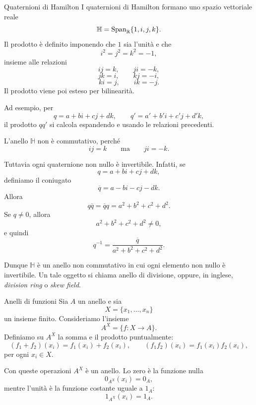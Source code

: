 \documentclass[a4paper]{article}
\begin{document}
\begin{radioactive}
\begin{snippetexample}{Quaternioni di Hamilton}
    I quaternioni di Hamilton formano uno spazio vettoriale reale
    \[
        \mathbb{H}
        =
        \operatorname{Span}_{\mathbb{R}}\{1,i,j,k\}.
    \]
    Il prodotto è definito imponendo che \(1\) sia l'unità e che
    \[
        i^2=j^2=k^2=-1,
    \]
    insieme alle relazioni
    \[
        ij=k,
        \qquad
        ji=-k,
    \]
    \[
        jk=i,
        \qquad
        kj=-i,
    \]
    \[
        ki=j,
        \qquad
        ik=-j.
    \]
    Il prodotto viene poi esteso per bilinearità.

    Ad esempio, per
    \[
        q=a+bi+cj+dk,
        \qquad
        q'=a'+b'i+c'j+d'k,
    \]
    il prodotto \(qq'\) si calcola espandendo e usando le relazioni precedenti.

    L'anello \(\mathbb{H}\) non è commutativo, perché
    \[
        ij=k
        \qquad
        \text{ma}
        \qquad
        ji=-k.
    \]

    Tuttavia ogni quaternione non nullo è invertibile.
    Infatti, se
    \[
        q=a+bi+cj+dk,
    \]
    definiamo il coniugato
    \[
        \overline{q}=a-bi-cj-dk.
    \]
    Allora
    \[
        q\overline{q}
        =
        \overline{q}q
        =
        a^2+b^2+c^2+d^2.
    \]
    Se \(q \neq 0\), allora
    \[
        a^2+b^2+c^2+d^2 \neq 0,
    \]
    e quindi
    \[
        q^{-1}
        =
        \frac{\overline{q}}{a^2+b^2+c^2+d^2}.
    \]

    Dunque \(\mathbb{H}\) è un anello non commutativo in cui ogni elemento non nullo è invertibile.
    Un tale oggetto si chiama anello di divisione, oppure, in inglese, \emph{division ring} o \emph{skew field}.
\end{snippetexample}
\end{radioactive}

\pagebreak

\begin{radioactive}
\begin{snippetexample}{Anelli di funzioni}
    Sia \(A\) un anello e sia
    \[
        X=\{x_1,\ldots,x_n\}
    \]
    un insieme finito. Consideriamo l'insieme
    \[
        A^X=\{f\colon X\to A\}.
    \]
    Definiamo su \(A^X\) la somma e il prodotto puntualmente:
    \[
        (f_1+f_2)(x_i)=f_1(x_i)+f_2(x_i),
        \qquad
        (f_1f_2)(x_i)=f_1(x_i)f_2(x_i),
    \]
    per ogni \(x_i \in X\).

    Con queste operazioni \(A^X\) è un anello.
    Lo zero è la funzione nulla
    \[
        0_{A^X}(x_i)=0_A,
    \]
    mentre l'unità è la funzione costante uguale a \(1_A\):
    \[
        1_{A^X}(x_i)=1_A.
    \]
\end{snippetexample}
\end{radioactive}
\end{document}

